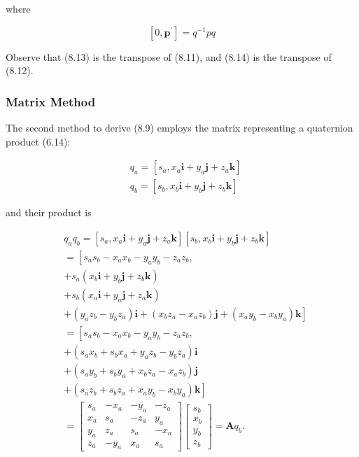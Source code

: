 \documentclass[10pt]{article}
\begin{document}
where

$$
\left[0, \mathbf{p}^{\prime}\right]=q^{-1} p q
$$

Observe that (8.13) is the transpose of (8.11), and (8.14) is the transpose of (8.12).

\subsubsection{Matrix Method}
The second method to derive (8.9) employs the matrix representing a quaternion product (6.14):

$$
\begin{aligned}
& q_{a}=\left[s_{a}, x_{a} \mathbf{i}+y_{a} \mathbf{j}+z_{a} \mathbf{k}\right] \\
& q_{b}=\left[s_{b}, x_{b} \mathbf{i}+y_{b} \mathbf{j}+z_{b} \mathbf{k}\right]
\end{aligned}
$$

and their product is

$$
\begin{aligned}
& q_{a} q_{b}=\left[s_{a}, x_{a} \mathbf{i}+y_{a} \mathbf{j}+z_{a} \mathbf{k}\right]\left[s_{b}, x_{b} \mathbf{i}+y_{b} \mathbf{j}+z_{b} \mathbf{k}\right] \\
& =\left[s_{a} s_{b}-x_{a} x_{b}-y_{a} y_{b}-z_{a} z_{b}\right. \text {, } \\
& +s_{a}\left(x_{b} \mathbf{i}+y_{b} \mathbf{j}+z_{b} \mathbf{k}\right) \\
& +s_{b}\left(x_{a} \mathbf{i}+y_{a} \mathbf{j}+z_{a} \mathbf{k}\right) \\
& \left.+\left(y_{a} z_{b}-y_{b} z_{a}\right) \mathbf{i}+\left(x_{b} z_{a}-x_{a} z_{b}\right) \mathbf{j}+\left(x_{a} y_{b}-x_{b} y_{a}\right) \mathbf{k}\right] \\
& =\left[s_{a} s_{b}-x_{a} x_{b}-y_{a} y_{b}-z_{a} z_{b}\right. \text {, } \\
& +\left(s_{a} x_{b}+s_{b} x_{a}+y_{a} z_{b}-y_{b} z_{a}\right) \mathbf{i} \\
& +\left(s_{a} y_{b}+s_{b} y_{a}+x_{b} z_{a}-x_{a} z_{b}\right) \mathbf{j} \\
& \left.+\left(s_{a} z_{b}+s_{b} z_{a}+x_{a} y_{b}-x_{b} y_{a}\right) \mathbf{k}\right] \\
& =\left[\begin{array}{cccc}
s_{a} & -x_{a} & -y_{a} & -z_{a} \\
x_{a} & s_{a} & -z_{a} & y_{a} \\
y_{a} & z_{a} & s_{a} & -x_{a} \\
z_{a} & -y_{a} & x_{a} & s_{a}
\end{array}\right]\left[\begin{array}{c}
s_{b} \\
x_{b} \\
y_{b} \\
z_{b}
\end{array}\right]=\mathbf{A} q_{b} .
\end{aligned}
$$
\end{document}
